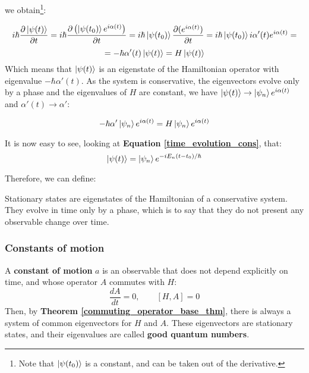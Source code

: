 we obtain\footnote{Note that $\ket{\psi(t_0)}$ is a constant, and can be taken out of the derivative.}:

\begin{equation*}
    i\hbar \frac{\partial \ket{\psi(t)}}{\partial t} = i \hbar \frac{\partial \left(\ket{\psi(t_0)}e^{i\alpha(t)}\right)}{\partial t} = i\hbar \ket{\psi(t_0)} \frac{\partial (e^{i\alpha(t)})}{\partial t} = i\hbar \ket{\psi(t_0)} i \alpha'(t)e^{i\alpha(t)} = 
\end{equation*}
\begin{equation}
    = -\hbar \alpha'(t)\ket{\psi(t)} = H \ket{\psi(t)}
\end{equation}
Which means that $\ket{\psi(t)}$ is an eigenstate of the Hamiltonian operator with eigenvalue $-\hbar \alpha'(t)$. As the system is conservative, the eigenvectors evolve only by a phase and the eigenvalues of $H$ are constant, we have $\ket{\psi(t)}\to\ket{\psi_n}e^{i\alpha(t)}$ and $\alpha'(t)\to \alpha'$:

\begin{equation}
    -\hbar \alpha'\ket{\psi_n}e^{i\alpha(t)} = H \ket{\psi_n}e^{i\alpha(t)}
\end{equation}

It is now easy to see, looking at \textbf{Equation \ref{time_evolution_cons}}, that:
\begin{equation}
    \ket{\psi(t)} = \ket{\psi_n}e^{-iE_n(t-t_0)/\hbar}
\end{equation}

Therefore, we can define:

\begin{definition}
    Stationary states are eigenstates of the Hamiltonian of a conservative system. They evolve in time only by a phase, which is to say that they do not present any observable change over time.
\end{definition}

\subsubsection{Constants of motion}

A \textbf{constant of motion} $a$ is an observable that does not depend explicitly on time, and whose operator $A$ commutes with $H$:
\begin{equation}
    \frac{dA}{dt} = 0,\qquad [H,A] = 0
\end{equation}
Then, by \textbf{Theorem \ref{commuting_operator_base_thm}}, there is always a system of common eigenvectors for $H$ and $A$. These eigenvectors are stationary states, and their eigenvalues are called \textbf{good quantum numbers}.

